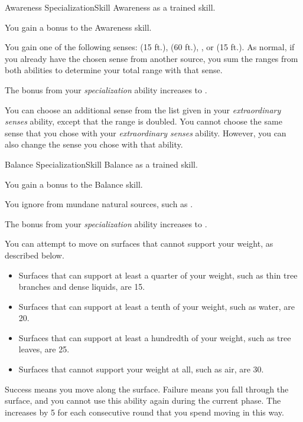   \begin{feat}{Awareness Specialization}{Skill}
    \featpre Awareness as a trained skill.

     You gain a  bonus to the Awareness skill.

     You gain one of the following senses:  (15 ft.),  (60 ft.), , or  (15 ft.).
    As normal, if you already have the chosen sense from another source, you sum the ranges from both abilities to determine your total range with that sense.

     The bonus from your \textit{specialization} ability increases to .

     You can choose an additional sense from the list given in your \textit{extraordinary senses} ability, except that the range is doubled.
    You cannot choose the same sense that you chose with your \textit{extraordinary senses} ability.
    However, you can also change the sense you chose with that ability.
  \end{feat}

  \begin{feat}{Balance Specialization}{Skill}
    \featpre Balance as a trained skill.

     You gain a  bonus to the Balance skill.

     You ignore  from mundane natural sources, such as .

     The bonus from your \textit{specialization} ability increases to .

     You can attempt to move on surfaces that cannot support your weight, as described below.
    \begin{itemize}
      \item Surfaces that can support at least a quarter of your weight, such as thin tree branches and dense liquids, are  15.
      \item Surfaces that can support at least a tenth of your weight, such as water, are  20.
      \item Surfaces that can support at least a hundredth of your weight, such as tree leaves, are  25.
      \item Surfaces that cannot support your weight at all, such as air, are  30.
    \end{itemize}

    Success means you move along the surface.
    Failure means you fall through the surface, and you cannot use this ability again during the current phase.
    The  increases by 5 for each consecutive round that you spend moving in this way.
  \end{feat}

